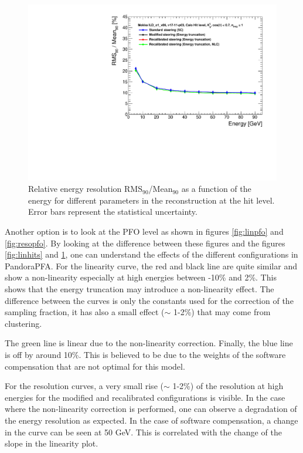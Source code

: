 \begin{figure}[htbp!]
  \centering
  \includegraphics[width=0.7\linewidth]{../Thesis_Plots/ILD/NoSmearing/Plots_Comparison/Comparison_resolution_Curves_Hits}
  \caption{Relative energy resolution RMS$_{90}$/Mean$_{90}$ as a function of the energy for different parameters in the reconstruction at the hit level. Error bars represent the statistical uncertainty.} \label{fig:resohits}
\end{figure}

Another option is to look at the PFO level as shown in figures \ref{fig:linpfo} and \ref{fig:resopfo}. By looking at the difference between these figures and the figures \ref{fig:linhits} and \ref{fig:resohits}, one can understand the effects of the different configurations in PandoraPFA. For the linearity curve, the red and black line are quite similar and show a non-linearity especially at high energies between -10\% and 2\%. This shows that the energy truncation may introduce a non-linearity effect. The difference between the curves is only the constants used for the correction of the sampling fraction, it has also a small effect ($\sim$ 1-2\%) that may come from clustering.

The green line is linear due to the non-linearity correction. Finally, the blue line is off by around 10\%. This is believed to be due to the weights of the software compensation that are not optimal for this model.

For the resolution curves, a very small rise ($\sim$ 1-2\%) of the resolution at high energies for the modified and recalibrated configurations is visible. In the case where the non-linearity correction is performed, one can observe a degradation of the energy resolution as expected. In the case of software compensation, a change in the curve can be seen at 50 GeV. This is correlated with the change of the slope in the linearity plot.

